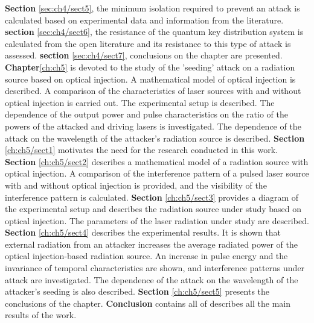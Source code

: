 \newline \textbf{Section} \ref{sec:ch4/sect5}, the minimum isolation required to prevent an attack is calculated based on experimental data and information from the literature.
\newline \textbf{section} \ref{sec:ch4/sect6}, the resistance of the quantum key distribution system is calculated from the open literature and its resistance to this type of attack is assessed.
\newline \textbf{section} \ref{sec:ch4/sect7}, conclusions on the chapter are presented.
\newline \textbf{Chapter}\ref{ch:ch5} is devoted to the study of the 'seeding' attack on a radiation source based on optical injection. A mathematical model of optical injection is described. A comparison of the characteristics of laser sources with and without optical injection is carried out. The experimental setup is described. The dependence of the output power and pulse characteristics on the ratio of the powers of the attacked and driving lasers is investigated. The dependence of the attack on the wavelength of the attacker's radiation source is described.
\newline \textbf{Section} \ref{ch:ch5/sect1} motivates the need for the research conducted in this work.
\newline \textbf{Section} \ref{ch:ch5/sect2} describes a mathematical model of a radiation source with optical injection. A comparison of the interference pattern of a pulsed laser source with and without optical injection is provided, and the visibility of the interference pattern is calculated.
\newline \textbf{Section} \ref{ch:ch5/sect3} provides a diagram of the experimental setup and describes the radiation source under study based on optical injection. The parameters of the laser radiation under study are described.
\newline \textbf{Section} \ref{ch:ch5/sect4} describes the experimental results. It is shown that external radiation from an attacker increases the average radiated power of the optical injection-based radiation source. An increase in pulse energy and the invariance of temporal characteristics are shown, and interference patterns under attack are investigated. The dependence of the attack on the wavelength of the attacker's seeding is also described.
\newline \textbf{Section} \ref{ch:ch5/sect5} presents the conclusions of the chapter.
\newline \textbf {Conclusion} contains all of describes all the main results of the work.
